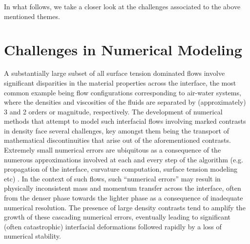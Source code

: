 In what follows, we take a closer look at the challenges associated to the above mentioned themes. 

\section*{Challenges in Numerical Modeling}

A substantially large subset of all surface tension dominated flows 
involve significant disparities in the material properties across 
the interface, the most common example being flow configurations 
corresponding to air-water systems, where the densities and viscosities
of the fluids are separated by (approximately) 3 and 2 orders or magnitude, respectively.  
The development of numerical methods that attempt to model 
such interfacial flows involving marked contrasts in density  
face several challenges, key amongst them being the transport of 
mathematical discontinuities that arise out of the aforementioned contrasts. 
Extremely small numerical errors are ubiquitous as a consequence of the 
numerous approximations involved at each and every step of the algorithm
(e.g. propagation of the interface, curvature computation, surface tension modeling etc) . 
In the context of such flows, such ``numerical errors'' may result in physically
inconsistent mass and momentum transfer across the interface, often from
the denser phase towards the lighter phase as a consequence of inadequate numerical resolution.
The presence of large density contrasts tend to amplify
the growth of these cascading numerical errors, eventually
leading to significant (often catastrophic) interfacial deformations
followed rapidly by a loss of numerical stability.


